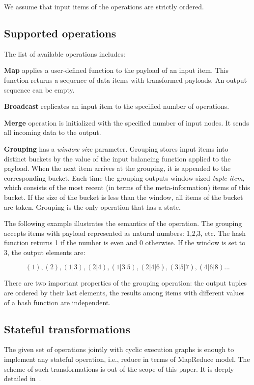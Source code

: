 We assume that input items of the operations are strictly ordered.

\subsection{Supported operations}
The list of available operations includes:

{\bf Map} applies a user-defined function to the payload of an input item. This function returns a sequence of data items with transformed payloads. An output sequence can be empty.

{\bf Broadcast} replicates an input item to the specified number of operations.

{\bf Merge} operation is initialized with the specified number of input nodes. It sends all incoming data to the output.

{\bf Grouping} has a {\it window size} parameter. Grouping stores input items into distinct buckets by the value of the input balancing function applied to the payload. When the next item arrives at the grouping, it is appended to the corresponding bucket. Each time the grouping outputs window-sized {\it tuple item}, which consists of the most recent (in terms of the meta-information) items of this bucket. If the size of the bucket is less than the window, all items of the bucket are taken. Grouping is the only operation that has a state.

The following example illustrates the semantics of the operation. The grouping accepts items with payload represented as natural numbers: 1,2,3, etc. The hash function returns 1 if the number is even and 0 otherwise. If the window is set to 3, the output elements are:

\[(1), (2), (1|3), (2|4), (1|3|5), (2|4|6), (3|5|7), (4|6|8)...\]

There are two important properties of the grouping operation: the output tuples are ordered by their last elements, the results among items with different values of a hash function are independent.

\subsection{Stateful transformations}
The given set of operations jointly with cyclic execution graphs is enough to implement any stateful operation, i.e., reduce in terms of MapReduce model. The scheme of such transformations is out of the scope of this paper. It is deeply detailed in~\cite{we2018seim}.

